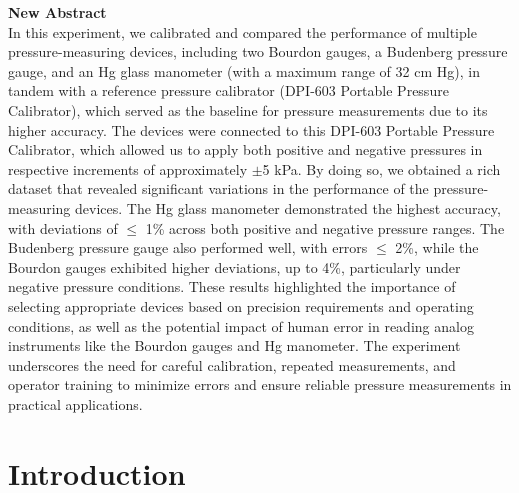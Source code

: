 \documentclass{article}
\begin{document}
\textbf{New Abstract}\\[1em]
In this experiment, we calibrated and compared the performance of multiple pressure-measuring devices, including two Bourdon gauges, a Budenberg pressure gauge, and an Hg glass manometer (with a maximum range of 32 cm Hg), in tandem with a reference pressure calibrator (DPI-603 Portable Pressure Calibrator), which served as the baseline for pressure measurements due to its higher accuracy. The devices were connected to this DPI-603 Portable Pressure Calibrator, which allowed us to apply both positive and negative pressures in respective increments of approximately $\pm$5 kPa. By doing so, we obtained a rich dataset that revealed significant variations in the performance of the pressure-measuring devices. The Hg glass manometer demonstrated the highest accuracy, with deviations of $\leq$ 1\% across both positive and negative pressure ranges. The Budenberg pressure gauge also performed well, with errors $\leq$ 2\%, while the Bourdon gauges exhibited higher deviations, up to 4\%, particularly under negative pressure conditions.  These results highlighted the importance of selecting appropriate devices based on precision requirements and operating conditions, as well as the potential impact of human error in reading analog instruments like the Bourdon gauges and Hg manometer. The experiment underscores the need for careful calibration, repeated measurements, and operator training to minimize errors and ensure reliable pressure measurements in practical applications.

	
	\newpage\vspace*{-20pt}
	\section{Introduction}
	
\end{document}
